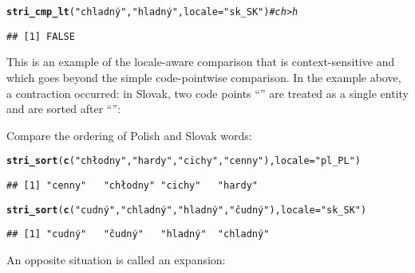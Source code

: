 \documentclass[nojss]{jss}\usepackage[]{graphicx}\usepackage[]{xcolor}
\makeatletter
\newcommand{\hlstr}[1]{\textcolor[rgb]{0.192,0.494,0.8}{#1}}%
\newcommand{\hlcom}[1]{\textcolor[rgb]{0.678,0.584,0.686}{\textit{#1}}}%
\newcommand{\hlstd}[1]{\textcolor[rgb]{0.345,0.345,0.345}{#1}}%
\newcommand{\hlkwc}[1]{\textcolor[rgb]{0.333,0.667,0.333}{#1}}%
\newcommand{\hlkwd}[1]{\textcolor[rgb]{0.737,0.353,0.396}{\textbf{#1}}}%
\newenvironment{kframe}{%
 \def\at@end@of@kframe{}%
 \ifinner\ifhmode%
  \def\at@end@of@kframe{\end{minipage}}%
  \begin{minipage}{\columnwidth}%
 \fi\fi%
 \def\FrameCommand##1{\hskip\@totalleftmargin \hskip-\fboxsep
 \colorbox{shadecolor}{##1}\hskip-\fboxsep
     \hskip-\linewidth \hskip-\@totalleftmargin \hskip\columnwidth}%
 \MakeFramed {\advance\hsize-\width
   \@totalleftmargin\z@ \linewidth\hsize
   \@setminipage}}%
 {\par\unskip\endMakeFramed%
 \at@end@of@kframe}
\newenvironment{knitrout}{}{} %
\makeatother
\begin{document}
\begin{knitrout}
\color{fgcolor}\begin{kframe}
\begin{alltt}
\hlkwd{stri_cmp_lt}\hlstd{(}\hlstr{"chladný"}\hlstd{,} \hlstr{"hladný"}\hlstd{,} \hlkwc{locale}\hlstd{=}\hlstr{"sk_SK"}\hlstd{)} \hlcom{# ch > h}
\end{alltt}
\begin{verbatim}
## [1] FALSE
\end{verbatim}
\end{kframe}
\end{knitrout}



This is an example of the locale-aware comparison
that is context-sensitive
and which goes beyond the simple code-pointwise comparison.
In the example above, a contraction occurred:
in Slovak,
two code points ``'' are treated as a single entity
and are sorted after ``'':


Compare the ordering of Polish and Slovak words:

\begin{knitrout}
\color{fgcolor}\begin{kframe}
\begin{alltt}
\hlkwd{stri_sort}\hlstd{(}\hlkwd{c}\hlstd{(}\hlstr{"chłodny"}\hlstd{,} \hlstr{"hardy"}\hlstd{,} \hlstr{"cichy"}\hlstd{,} \hlstr{"cenny"}\hlstd{),} \hlkwc{locale}\hlstd{=}\hlstr{"pl_PL"}\hlstd{)}
\end{alltt}
\begin{verbatim}
## [1] "cenny"   "chłodny" "cichy"   "hardy"
\end{verbatim}
\begin{alltt}
\hlkwd{stri_sort}\hlstd{(}\hlkwd{c}\hlstd{(}\hlstr{"cudný"}\hlstd{,} \hlstr{"chladný"}\hlstd{,} \hlstr{"hladný"}\hlstd{,} \hlstr{"čudný"}\hlstd{),} \hlkwc{locale}\hlstd{=}\hlstr{"sk_SK"}\hlstd{)}
\end{alltt}
\begin{verbatim}
## [1] "cudný"   "čudný"   "hladný"  "chladný"
\end{verbatim}
\end{kframe}
\end{knitrout}



An opposite situation is called an expansion:
\end{document}
